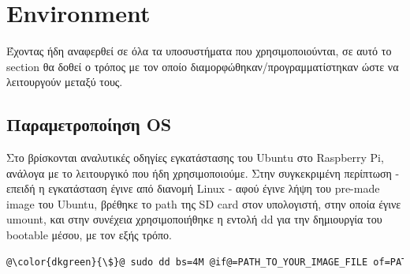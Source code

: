 \begin{table}[H]
    \caption[]{Bill of Materials}
    \label{tab:thesis-system-bom}
    \centering
  \end{table}



\section{Environment}
Έχοντας ήδη αναφερθεί σε όλα τα υποσυστήματα που χρησιμοποιούνται, σε αυτό το section θα δοθεί ο τρόπος με τον οποίο διαμορφώθηκαν/προγραμματίστηκαν ώστε να λειτουργούν μεταξύ τους.


\subsection{Παραμετροποίηση OS} 
Στο \cite{ubuntu-raspi-intall} βρίσκονται αναλυτικές οδηγίες εγκατάστασης του Ubuntu στο Ra\-spbe\-rry Pi, ανάλογα με το λειτουργικό που ήδη χρησιμοποιούμε. Στην συγκεκριμένη περίπτωση - επειδή η εγκατάσταση έγινε από διανομή Linux - αφού έγινε λήψη του pre-made image του Ubuntu, βρέθηκε το path της SD card στον υπολογιστή, στην οποία έγινε umount, και στην συνέχεια χρησιμοποιήθηκε η εντολή dd για την δημιουργία του bootable μέσου, με τον εξής τρόπο.

\begin{lstlisting}[language=sh, escapechar=@, caption={Create bootable SD from Linux},label=create-bootable-sd-terminal]
    @\color{dkgreen}{\$}@ sudo dd bs=4M @if@=PATH_TO_YOUR_IMAGE_FILE of=PATH_TO_YOUR_SD_CARD status=progress
\end{lstlisting}

